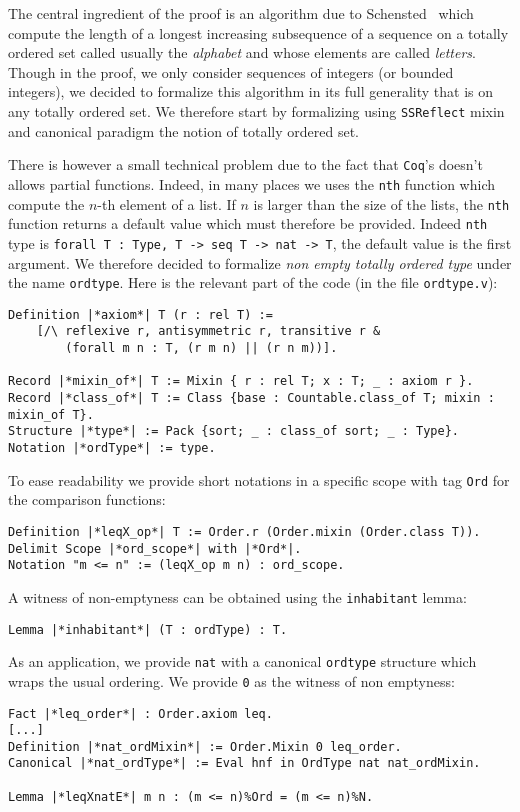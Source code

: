 \documentclass[12pt,a4paper]{article}
\let\verb=\lstinline
\newcommand{\Coq}{\texttt{Coq}\xspace}
\newcommand{\SSR}{\texttt{SSReflect}\xspace}
\begin{document}
The central ingredient of the proof is an algorithm due to
Schensted~\cite{schensted} which compute the length of a longest increasing
subsequence of a sequence on a totally ordered set called usually the
\emph{alphabet} and whose elements are called \emph{letters}. Though in the
proof, we only consider sequences of integers (or bounded integers), we decided
to formalize this algorithm in its full generality that is on any totally
ordered set. We therefore start by formalizing using \SSR mixin and canonical
paradigm the notion of totally ordered set.

There is however a small technical problem due to the fact that \Coq's doesn't
allows partial functions. Indeed, in many places we uses the \verb|nth|
function which compute the $n$-th element of a list. If $n$ is larger than the
size of the lists, the \verb|nth| function returns a default value which
must therefore be provided. Indeed \verb|nth| type is
\verb|forall T : Type, T -> seq T -> nat -> T|,
the default value is the first argument. We therefore decided to formalize
\emph{non empty totally ordered type} under the name \verb|ordtype|. Here
is the relevant part of the code (in the file \verb|ordtype.v|):
\begin{lstlisting}
Definition |*axiom*| T (r : rel T) :=
    [/\ reflexive r, antisymmetric r, transitive r &
        (forall m n : T, (r m n) || (r n m))].

Record |*mixin_of*| T := Mixin { r : rel T; x : T; _ : axiom r }.
Record |*class_of*| T := Class {base : Countable.class_of T; mixin : mixin_of T}.
Structure |*type*| := Pack {sort; _ : class_of sort; _ : Type}.
Notation |*ordType*| := type.
\end{lstlisting}
To ease readability we provide short notations in a specific scope with tag
\verb|Ord| for the comparison functions:
\begin{lstlisting}
Definition |*leqX_op*| T := Order.r (Order.mixin (Order.class T)).
Delimit Scope |*ord_scope*| with |*Ord*|.
Notation "m <= n" := (leqX_op m n) : ord_scope.
\end{lstlisting}
A witness of non-emptyness can be obtained using the \verb+inhabitant+ lemma:
\begin{lstlisting}
Lemma |*inhabitant*| (T : ordType) : T.
\end{lstlisting}
As an application, we provide \verb|nat| with a canonical \verb|ordtype|
structure which wraps the usual ordering. We provide \verb|0| as the witness
of non emptyness:
\begin{lstlisting}
Fact |*leq_order*| : Order.axiom leq.
[...]
Definition |*nat_ordMixin*| := Order.Mixin 0 leq_order.
Canonical |*nat_ordType*| := Eval hnf in OrdType nat nat_ordMixin.

Lemma |*leqXnatE*| m n : (m <= n)%Ord = (m <= n)%N.
\end{lstlisting}
\end{document}

